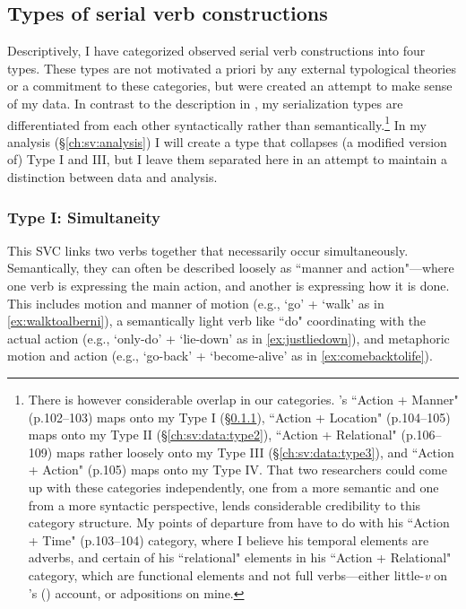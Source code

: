 \subsection{Types of serial verb constructions}

Descriptively, I have categorized observed serial verb constructions into four types. These types are not motivated a priori by any external typological theories or a commitment to these categories, but were created an attempt to make sense of my data. In contrast to the description in \citet[p.~102--109]{nakayama2001}, my serialization types are differentiated from each other syntactically rather than semantically.\footnote{There is however considerable overlap in our categories. \citeauthor{nakayama2001}'s ``Action + Manner" (p.102--103) maps onto my Type I (\S\ref{ch:sv:data:type1}), ``Action + Location" (p.104--105) maps onto my Type II (\S\ref{ch:sv:data:type2}), ``Action + Relational" (p.106--109) maps rather loosely onto my Type III (\S\ref{ch:sv:data:type3}), and ``Action + Action" (p.105) maps onto my Type IV. That two researchers could come up with these categories independently, one from a more semantic and one from a more syntactic perspective, lends considerable credibility to this category structure. My points of departure from \citeauthor{nakayama2001} have to do with his ``Action + Time" (p.103--104) category, where I believe his temporal elements are adverbs, and certain of his ``relational" elements in his ``Action + Relational" category, which are functional elements and not full verbs---either little-\textit{v} on \citeauthor{woo2007b}'s (\citeyear{woo2007b}) account, or adpositions on mine.} In my analysis (\S\ref{ch:sv:analysis}) I will create a type that collapses (a modified version of) Type I and III, but I leave them separated here in an attempt to maintain a distinction between data and analysis.

\vspace{10pt}

\subsubsection{Type I: Simultaneity} \label{ch:sv:data:type1}

\vspace{10pt}

This SVC links two verbs together that necessarily occur simultaneously. Semantically, they can often be described loosely as ``manner and action"---where one verb is expressing the main action, and another is expressing how it is done. This includes motion and manner of motion (e.g., `go' + `walk' as in \ref{ex:walktoalberni}), a semantically light verb like ``do" coordinating with the actual action (e.g., `only-do' + `lie-down' as in \ref{ex:justliedown}), and metaphoric motion and action (e.g., `go-back' + `become-alive' as in \ref{ex:comebacktolife}).

